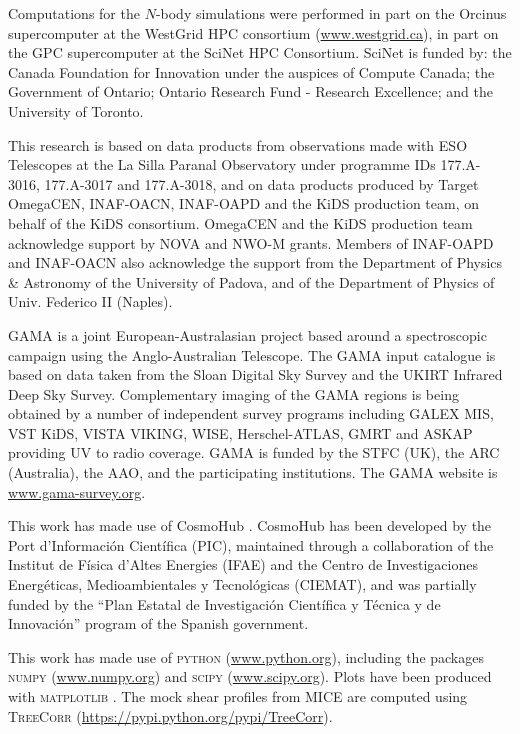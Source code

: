 \documentclass[usenatbib]{mnras}
\begin{document}
Computations for the $N$-body simulations were performed in part on the Orcinus supercomputer at the WestGrid HPC consortium (\url{www.westgrid.ca}), in part on the GPC supercomputer at the SciNet HPC Consortium. SciNet is funded by: the Canada Foundation for Innovation under the auspices of Compute Canada; the Government of Ontario; Ontario Research Fund - Research Excellence; and the University of Toronto.

This research is based on data products from observations made with ESO Telescopes at the La Silla Paranal Observatory under programme IDs 177.A-3016, 177.A-3017 and 177.A-3018, and on data products produced by Target OmegaCEN, INAF-OACN, INAF-OAPD and the KiDS production team, on behalf of the KiDS consortium. OmegaCEN and the KiDS production team acknowledge support by NOVA and NWO-M grants. Members of INAF-OAPD and INAF-OACN also acknowledge the support from the Department of Physics \& Astronomy of the University of Padova, and of the Department of Physics of Univ. Federico II (Naples).

GAMA is a joint European-Australasian project based around a spectroscopic campaign using the Anglo-Australian Telescope. The GAMA input catalogue is based on data taken from the Sloan Digital Sky Survey and the UKIRT Infrared Deep Sky Survey. Complementary imaging of the GAMA regions is being obtained by a number of independent survey programs including GALEX MIS, VST KiDS, VISTA VIKING, WISE, Herschel-ATLAS, GMRT and ASKAP providing UV to radio coverage. GAMA is funded by the STFC (UK), the ARC (Australia), the AAO, and the participating institutions. The GAMA website is \url{www.gama-survey.org}.

This work has made use of CosmoHub \cite[]{carretero2017,tallada2020}. CosmoHub has been developed by the Port d'Informaci{\'o}n Cient{\'i}fica (PIC), maintained through a collaboration of the Institut de F{\'i}sica d'Altes Energies (IFAE) and the Centro de Investigaciones Energ{\'e}ticas, Medioambientales y Tecnol{\'o}gicas (CIEMAT), and was partially funded by the ``Plan Estatal de Investigaci{\'o}n Cient{\'i}fica y T{\'e}cnica y de Innovaci{\'o}n'' program of the Spanish government.

This work has made use of {\scshape python} (\url{www.python.org}), including the packages {\scshape numpy} (\url{www.numpy.org}) and {\scshape scipy} (\url{www.scipy.org}). Plots have been produced with {\scshape matplotlib} \cite[]{hunter2007}. The mock shear profiles from MICE are computed using {\scshape TreeCorr} (\url{https://pypi.python.org/pypi/TreeCorr}).
\end{document}
